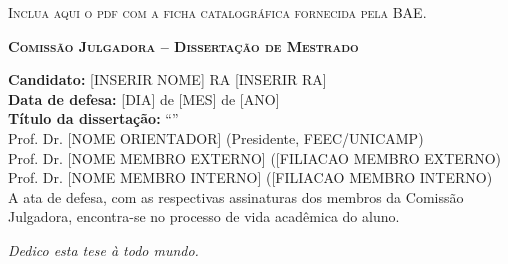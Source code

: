  \begin{fichacatalografica}
    \vspace*{\fill}
    \begin{center}
        \textsc{Inclua aqui o pdf com a ficha catalogr\'{a}fica fornecida pela BAE.}
    \end{center}
    \vspace*{\fill}
 \end{fichacatalografica}




\newpage
\begin{center}
\textbf{\textsc{Comissão Julgadora -- Dissertação de Mestrado}}\\[1cm]
\end{center}

\noindent\textbf{Candidato:} [INSERIR NOME] \quad RA [INSERIR RA] \\
\noindent\textbf{Data de defesa:} [DIA] de [MES] de [ANO] \\

\noindent\textbf{Título da dissertação:} \noindent ``\thetitle'' \\[2cm]
Prof. Dr. [NOME ORIENTADOR] (Presidente, FEEC/UNICAMP) \\[1pt]
Prof. Dr. [NOME MEMBRO EXTERNO] ([FILIACAO MEMBRO EXTERNO)\\[1pt]
Prof. Dr. [NOME MEMBRO INTERNO] ([FILIACAO MEMBRO INTERNO)\\[2cm]
\noindent
A ata de defesa, com as respectivas assinaturas dos membros da Comissão Julgadora, encontra-se no processo de vida acadêmica do aluno.\\

\vspace*{\fill}
\newpage
%   
\cleardoublepage



\begin{dedicatoria}
    \vspace*{\fill}
    \centering
    \noindent
    \textit{Dedico esta tese \`{a} todo mundo.}
    \vspace*{\fill}
\end{dedicatoria}

